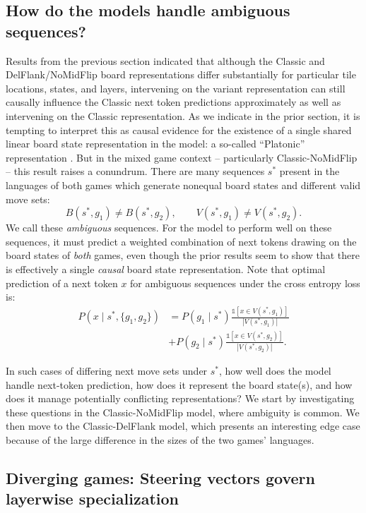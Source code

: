 \documentclass{article}
\theoremstyle{plain}
\theoremstyle{definition}
\theoremstyle{remark}
\begin{document}
\subsection{How do the models handle ambiguous sequences?}

Results from the previous section indicated that although the Classic and DelFlank/NoMidFlip board representations differ substantially for particular tile locations, states, and layers, intervening on the variant representation can still causally influence the Classic next token predictions approximately as well as intervening on the Classic representation. As we indicate in the prior section, it is tempting to interpret this as causal evidence for the existence of a single shared linear board state representation in the model: a so-called ``Platonic'' representation \cite{huh_platonic_2024}. But in the mixed game context -- particularly Classic-NoMidFlip -- this result raises a conundrum. There are many sequences $s^*$ present in the languages of both games which generate nonequal board states and different valid move sets:
\[
B(s^*, g_1) \neq B(s^*, g_2), \qquad V(s^*, g_1) \neq V(s^*, g_2).
\]
We call these \textit{ambiguous} sequences. For the model to perform well on these sequences, it must predict a weighted combination of next tokens drawing on the board states of \textit{both} games, even though the prior results seem to show that there is effectively a single \textit{causal} board state representation. Note that optimal prediction of a next token $x$ for ambiguous sequences under the cross entropy loss is:
\begin{align}
    P(x \mid s^*, \{g_1, g_2\})
        &= P(g_1 \mid s^*) \frac{\mathds{1}[x \in V(s^*, g_1)]}{|V(s^*, g_1)|} \nonumber \\
        &+ P(g_2 \mid s^*) \frac{\mathds{1}[x \in V(s^*, g_2)]}{|V(s^*, g_2)|}. 
\end{align}

In such cases of differing next move sets under $s^*$, how well does the model handle next-token prediction, how does it represent the board state(s), and how does it manage potentially conflicting representations? We start by investigating these questions in the Classic-NoMidFlip model, where ambiguity is common. We then move to the Classic-DelFlank model, which presents an interesting edge case because of the large difference in the sizes of the two games' languages.

\subsection{Diverging games: Steering vectors govern layerwise specialization}\label{ambiguity}
\end{document}
